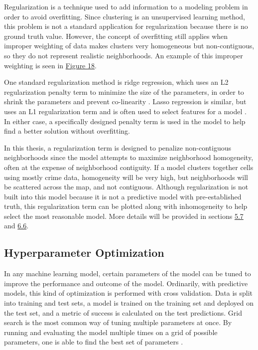 \documentclass[times new roman,12pt]{article}
\begin{document}
Regularization is a technique used to add information to a modeling problem in order to avoid overfitting. Since clustering is an unsupervised learning method, this problem is not a standard application for regularization because there is no ground truth value. However, the concept of overfitting still applies when improper weighting of data makes clusters very homogeneous but non-contiguous, so they do not represent realistic neighborhoods. An example of this improper weighting is seen in \hyperref[geok_1]{Figure 18}.

One standard regularization method is ridge regression, which uses an L2 regularization penalty term to minimize the size of the parameters, in order to shrink the parameters and prevent co-linearity \cite{HoerlArthurE.2000RRBE}. Lasso regression is similar, but uses an L1 regularization term and is often used to select features for a model \cite{tibshirani1996regression}. In either case, a specifically designed penalty term is used in the model to help find a better solution without overfitting. 

In this thesis, a regularization term is designed to penalize non-contiguous neighborhoods since the model attempts to maximize neighborhood homogeneity, often at the expense of neighborhood contiguity. If a model clusters together cells using mostly crime data, homogeneity will be very high, but neighborhoods will be scattered across the map, and not contiguous. Although regularization is not built into this model because it is not a predictive model with pre-established truth, this regularization term can be plotted along with inhomogeneity to help select the most reasonable model. More details will be provided in sections \hyperref[sec:reg]{5.7} and \hyperref[reg_opt]{6.6}.

\subsection{Hyperparameter Optimization}

In any machine learning model, certain parameters of the model can be tuned to improve the performance and outcome of the model. Ordinarily, with predictive models, this kind of optimization is performed with cross validation. Data is split into training and test sets, a model is trained on the training set and deployed on the test set, and a metric of success is calculated on the test predictions. Grid search is the most common way of tuning multiple parameters at once. By running and evaluating the model multiple times on a grid of possible parameters, one is able to find the best set of parameters \cite{claesen2015hyperparameter}.
\end{document}
